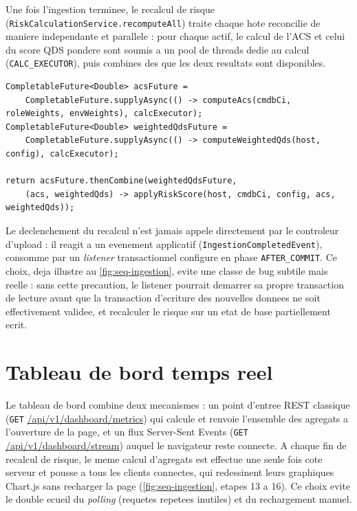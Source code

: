 Une fois l'ingestion terminee, le recalcul de risque
(\texttt{RiskCalculationService.\allowbreak recomputeAll}) traite chaque hote reconcilie de
maniere independante et parallele : pour chaque actif, le calcul de l'ACS et celui
du score QDS pondere sont soumis a un pool de threads dedie au calcul
(\texttt{CALC\_EXECUTOR}), puis combines des que les deux resultats sont disponibles.

\begin{lstlisting}[caption={Parallelisation du calcul par actif (RiskCalculationService)},label={lst:parallel}]
CompletableFuture<Double> acsFuture =
    CompletableFuture.supplyAsync(() -> computeAcs(cmdbCi, roleWeights, envWeights), calcExecutor);
CompletableFuture<Double> weightedQdsFuture =
    CompletableFuture.supplyAsync(() -> computeWeightedQds(host, config), calcExecutor);

return acsFuture.thenCombine(weightedQdsFuture,
    (acs, weightedQds) -> applyRiskScore(host, cmdbCi, config, acs, weightedQds));
\end{lstlisting}

Le declenchement du recalcul n'est jamais appele directement par le controleur
d'upload : il reagit a un evenement applicatif
(\texttt{IngestionCompletedEvent}), consomme par un \emph{listener}
transactionnel configure en phase \texttt{AFTER\_COMMIT}. Ce choix, deja illustre au
\cref{fig:seq-ingestion}, evite une classe de bug subtile mais reelle : sans cette
precaution, le listener pourrait demarrer sa propre transaction de lecture avant que
la transaction d'ecriture des nouvelles donnees ne soit effectivement validee, et
recalculer le risque sur un etat de base partiellement ecrit.

\section{Tableau de bord temps reel}

Le tableau de bord combine deux mecanismes : un point d'entree REST classique
(\texttt{GET} \url{/api/v1/dashboard/metrics}) qui calcule et renvoie l'ensemble des
agregats a l'ouverture de la page, et un flux Server-Sent Events
(\texttt{GET} \url{/api/v1/dashboard/stream}) auquel le navigateur reste connecte. A
chaque fin de recalcul de risque, le meme calcul d'agregats est effectue une seule
fois cote serveur et pousse a tous les clients connectes, qui redessinent leurs
graphiques Chart.js sans recharger la page (\cref{fig:seq-ingestion}, etapes
13 a 16). Ce choix evite le double ecueil du \emph{polling} (requetes repetees
inutiles) et du rechargement manuel.

